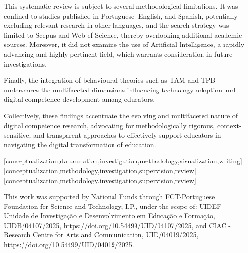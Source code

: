 \documentclass[english]{textolivre}
\begin{document}
This systematic review is subject to several methodological limitations. It was confined to studies published in Portuguese, English, and Spanish, potentially excluding relevant research in other languages, and the search strategy was limited to Scopus and Web of Science, thereby overlooking additional academic sources. Moreover, it did not examine the use of Artificial Intelligence, a rapidly advancing and highly pertinent field, which warrants consideration in future investigations.

Finally, the integration of behavioural theories such as TAM and TPB underscores the multifaceted dimensions influencing technology adoption and digital competence development among educators.

Collectively, these findings accentuate the evolving and multifaceted nature of digital competence research, advocating for methodologically rigorous, context-sensitive, and transparent approaches to effectively support educators in navigating the digital transformation of education.

\printbibliography\label{sec-bib}


\begin{contributors}
[conceptualization,datacuration,investigation,methodology,visualization,writing]
[conceptualization,methodology,investigation,supervision,review]
[conceptualization,methodology,investigation,supervision,review]
\end{contributors}


\begin{dataavailability}
\end{dataavailability}

\begin{funding}
This work was supported by National Funds through FCT-Portuguese Foundation for Science and Technology, I.P., under the scope of:  UIDEF - Unidade de Investigação e Desenvolvimento em Educação e Formação, UIDB/04107/2025, https://doi.org/10.54499/UID/04107/2025, and CIAC - Research Centre for Arts and Communication, UID/04019/2025, https://doi.org/10.54499/UID/04019/2025. 
\end{funding}
\end{document}
